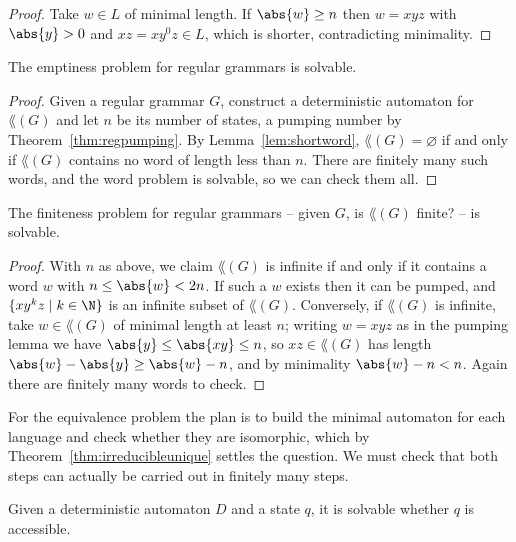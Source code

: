 \begin{proof}
	Take $w \in L$ of minimal length. If $\abs{w} \geq n$ then $w = xyz$ with $\abs{y} > 0$ and $xz = xy^0z \in L$, which is shorter, contradicting minimality.
\end{proof}

\begin{corollary}\label{cor:regemptiness}
	The emptiness problem for regular grammars is solvable.
\end{corollary}

\begin{proof}
	Given a regular grammar $G$, construct a deterministic automaton for $\lang(G)$ and let $n$ be its number of states, a pumping number by Theorem~\ref{thm:regpumping}. By Lemma~\ref{lem:shortword}, $\lang(G) = \varnothing$ if and only if $\lang(G)$ contains no word of length less than $n$. There are finitely many such words, and the word problem is solvable, so we can check them all.
\end{proof}

\begin{corollary}
	The finiteness problem for regular grammars -- given $G$, is $\lang(G)$ finite? -- is solvable.
\end{corollary}

\begin{proof}
	With $n$ as above, we claim $\lang(G)$ is infinite if and only if it contains a word $w$ with $n \leq \abs{w} < 2n$. If such a $w$ exists then it can be pumped, and $\{xy^kz \mid k \in \N\}$ is an infinite subset of $\lang(G)$. Conversely, if $\lang(G)$ is infinite, take $w \in \lang(G)$ of minimal length at least $n$; writing $w = xyz$ as in the pumping lemma we have $\abs{y} \leq \abs{xy} \leq n$, so $xz \in \lang(G)$ has length $\abs{w} - \abs{y} \geq \abs{w} - n$, and by minimality $\abs{w} - n < n$. Again there are finitely many words to check.
\end{proof}

For the equivalence problem the plan is to build the minimal automaton for each language and check whether they are isomorphic, which by Theorem~\ref{thm:irreducibleunique} settles the question. We must check that both steps can actually be carried out in finitely many steps.

\begin{proposition}
	Given a deterministic automaton $D$ and a state $q$, it is solvable whether $q$ is accessible.
\end{proposition}

